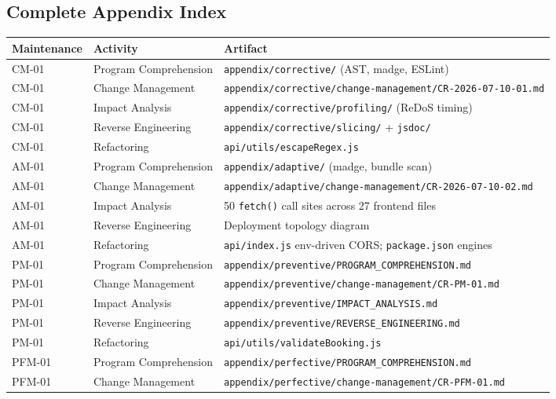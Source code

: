 \documentclass[11pt,a4paper]{article}
\begin{document}
\subsection*{Complete Appendix Index}

\begin{longtable}{@{}p{3cm}p{3.2cm}p{7.1cm}@{}}
\toprule
\textbf{Maintenance} & \textbf{Activity} & \textbf{Artifact} \\
\midrule
\endhead
CM-01 & Program Comprehension & \texttt{appendix/corrective/} (AST, madge, ESLint) \\
CM-01 & Change Management    & \texttt{appendix/corrective/change-management/CR-2026-07-10-01.md} \\
CM-01 & Impact Analysis      & \texttt{appendix/corrective/profiling/} (ReDoS timing) \\
CM-01 & Reverse Engineering  & \texttt{appendix/corrective/slicing/} + \texttt{jsdoc/} \\
CM-01 & Refactoring          & \texttt{api/utils/escapeRegex.js} \\[3pt]
AM-01 & Program Comprehension & \texttt{appendix/adaptive/} (madge, bundle scan) \\
AM-01 & Change Management    & \texttt{appendix/adaptive/change-management/CR-2026-07-10-02.md} \\
AM-01 & Impact Analysis      & 50 \texttt{fetch()} call sites across 27 frontend files \\
AM-01 & Reverse Engineering  & Deployment topology diagram \\
AM-01 & Refactoring          & \texttt{api/index.js} env-driven CORS; \texttt{package.json} engines \\[3pt]
PM-01 & Program Comprehension & \texttt{appendix/preventive/PROGRAM\_COMPREHENSION.md} \\
PM-01 & Change Management    & \texttt{appendix/preventive/change-management/CR-PM-01.md} \\
PM-01 & Impact Analysis      & \texttt{appendix/preventive/IMPACT\_ANALYSIS.md} \\
PM-01 & Reverse Engineering  & \texttt{appendix/preventive/REVERSE\_ENGINEERING.md} \\
PM-01 & Refactoring          & \texttt{api/utils/validateBooking.js} \\[3pt]
PFM-01 & Program Comprehension & \texttt{appendix/perfective/PROGRAM\_COMPREHENSION.md} \\
PFM-01 & Change Management   & \texttt{appendix/perfective/change-management/CR-PFM-01.md} \\

\end{longtable}
\end{document}
